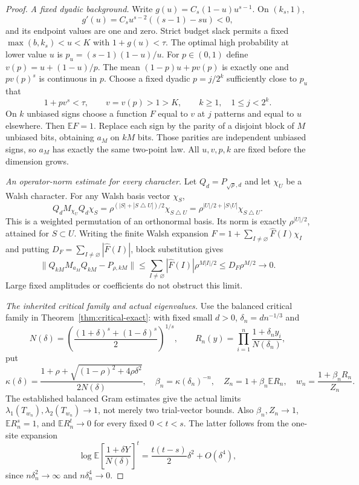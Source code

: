 \begin{proof}
\emph{A fixed dyadic background.}
Write $g(u)=C_s(1-u)u^{s-1}$. On $(k_s,1)$,
\[
 g'(u)=C_su^{s-2}((s-1)-su)<0,
\]
and its endpoint values are one and zero. Strict budget slack permits
a fixed $\max(b,k_s)<u<K$ with $1+g(u)<\tau$. The optimal high
probability at lower value $u$ is $p_u=(s-1)(1-u)/u$.
For $p\in(0,1)$ define $v(p)=u+(1-u)/p$. The mean
$(1-p)u+pv(p)$ is exactly one and $pv(p)^s$ is continuous in $p$.
Choose a fixed dyadic $p=j/2^k$ sufficiently close to $p_u$ that
\[
 1+pv^s<\tau,\qquad v=v(p)>1>K,
 \qquad k\ge1,\quad 1\le j<2^k.
\]
On $k$ unbiased signs choose a function $F$ equal to $v$ at $j$
patterns and equal to $u$ elsewhere. Then $\mathbb EF=1$.
Replace each sign by the parity of a disjoint block of $M$ unbiased
bits, obtaining $a_M$ on $kM$ bits. Those parities are independent
unbiased signs, so $a_M$ has exactly the same two-point law.
All $u,v,p,k$ are fixed before the dimension grows.

\emph{An operator-norm estimate for every character.}
Let $Q_d=P_{\sqrt\rho,d}$ and let $\chi_U$ be a Walsh character.
For any Walsh basis vector $\chi_S$,
\[
 Q_dM_{\chi_U}Q_d\chi_S
 =\rho^{(|S|+|S\mathbin\triangle U|)/2}\chi_{S\mathbin\triangle U}
 =\rho^{|U|/2+|S\setminus U|}\chi_{S\mathbin\triangle U}.
\]
This is a weighted permutation of an orthonormal basis. Its norm is
exactly $\rho^{|U|/2}$, attained for $S\subset U$.
Writing the finite Walsh expansion
$F=1+\sum_{I\ne\varnothing}\widehat F(I)\chi_I$ and putting
$D_F=\sum_{I\ne\varnothing}|\widehat F(I)|$, block substitution gives
\[
 \|Q_{kM}M_{a_M}Q_{kM}-P_{\rho,kM}\|
 \le \sum_{I\ne\varnothing}|\widehat F(I)|\rho^{M|I|/2}
 \le D_F\rho^{M/2}\longrightarrow0.                 \tag{31}
\]
Large fixed amplitudes or coefficients do not obstruct this limit.

\emph{The inherited critical family and actual eigenvalues.}
Use the balanced critical family in Theorem~\ref{thm:critical-exact}:
with fixed small $d>0$, $\delta_n=dn^{-1/3}$ and
\[
 N(\delta)=\left(\frac{(1+\delta)^s+(1-\delta)^s}{2}\right)^{1/s},
 \qquad R_n(y)=\prod_{i=1}^n\frac{1+\delta_n y_i}{N(\delta_n)},
\]
put
\[
 \kappa(\delta)=\frac{1+\rho+
 \sqrt{(1-\rho)^2+4\rho\delta^2}}{2N(\delta)},\quad
 \beta_n=\kappa(\delta_n)^{-n},\quad
 Z_n=1+\beta_n\mathbb ER_n,\quad
 w_n=\frac{1+\beta_nR_n}{Z_n}.
\]
The established balanced Gram estimates give the actual limits
$\lambda_1(T_{w_n}),\lambda_2(T_{w_n})\to1$, not merely two
trial-vector bounds. Also $\beta_n,Z_n\to1$, $\mathbb ER_n^s=1$,
and $\mathbb ER_n^t\to0$ for every fixed $0<t<s$.
The latter follows from the one-site expansion
\[
 \log\mathbb E\left[\frac{1+\delta Y}{N(\delta)}\right]^t
 =\frac{t(t-s)}2\delta^2+O(\delta^4),
\]
since $n\delta_n^2\to\infty$ and $n\delta_n^4\to0$.


\end{proof}
